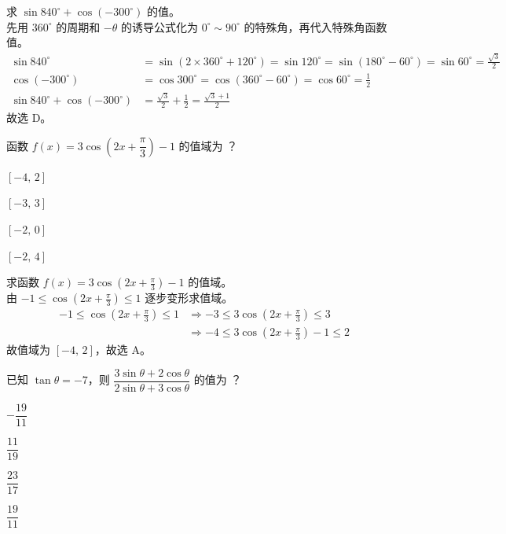 \documentclass[12pt,a4paper,fontset=none]{exam-zh}
\begin{document}
\begin{solution}
    求 $\sin 840^{\circ}+\cos(-300^{\circ})$ 的值。 \\
    先用 $360^{\circ}$ 的周期和 $-\theta$ 的诱导公式化为 $0^{\circ}\sim 90^{\circ}$ 的特殊角，再代入特殊角函数值。 \\
    \begin{align*}
        \sin 840^{\circ} &= \sin(2\times 360^{\circ}+120^{\circ}) = \sin 120^{\circ} = \sin(180^{\circ}-60^{\circ}) = \sin 60^{\circ} = \frac{\sqrt{3}}{2} \\
        \cos(-300^{\circ}) &= \cos 300^{\circ} = \cos(360^{\circ}-60^{\circ}) = \cos 60^{\circ} = \frac{1}{2} \\
        \sin 840^{\circ}+\cos(-300^{\circ}) &= \frac{\sqrt{3}}{2}+\frac{1}{2} = \frac{\sqrt{3}+1}{2}
    \end{align*}
    故选 D。
\end{solution}

\begin{question}
    函数 $f(x)=3\cos\left(2x+\dfrac{\pi}{3}\right)-1$ 的值域为 \paren[A]？
    \begin{choices}
        \item $[-4,\,2]$
        \item $[-3,\,3]$
        \item $[-2,\,0]$
        \item $[-2,\,4]$
    \end{choices}
\end{question}

\begin{solution}
    求函数 $f(x)=3\cos\left(2x+\frac{\pi}{3}\right)-1$ 的值域。 \\
    由 $-1\le\cos\left(2x+\frac{\pi}{3}\right)\le 1$ 逐步变形求值域。 \\
    \begin{align*}
        -1 \le \cos\left(2x+\frac{\pi}{3}\right) \le 1 &\Rightarrow -3 \le 3\cos\left(2x+\frac{\pi}{3}\right) \le 3 \\
        &\Rightarrow -4 \le 3\cos\left(2x+\frac{\pi}{3}\right)-1 \le 2
    \end{align*}
    故值域为 $[-4,\,2]$，故选 A。
\end{solution}

\newpage

\begin{question}
    已知 $\tan\theta=-7$，则 $\dfrac{3\sin\theta+2\cos\theta}{2\sin\theta+3\cos\theta}$ 的值为 \paren[D]？
    \begin{choices}
        \item $-\dfrac{19}{11}$
        \item $\dfrac{11}{19}$
        \item $\dfrac{23}{17}$
        \item $\dfrac{19}{11}$
    \end{choices}
\end{question}
\end{document}

